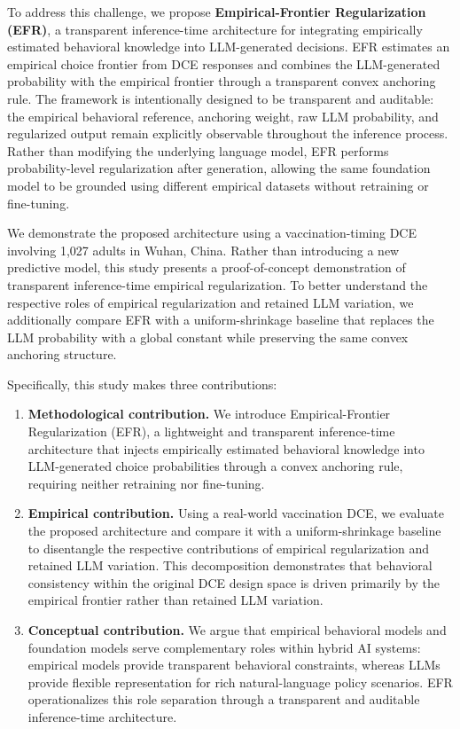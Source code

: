 \documentclass[11pt]{article}
\begin{document}
To address this challenge, we propose \textbf{Empirical-Frontier Regularization (EFR)}, a transparent inference-time architecture for integrating empirically estimated behavioral knowledge into LLM-generated decisions. EFR estimates an empirical choice frontier from DCE responses and combines the LLM-generated probability with the empirical frontier through a transparent convex anchoring rule. The framework is intentionally designed to be transparent and auditable: the empirical behavioral reference, anchoring weight, raw LLM probability, and regularized output remain explicitly observable throughout the inference process. Rather than modifying the underlying language model, EFR performs probability-level regularization after generation, allowing the same foundation model to be grounded using different empirical datasets without retraining or fine-tuning.

We demonstrate the proposed architecture using a vaccination-timing DCE involving 1,027 adults in Wuhan, China. Rather than introducing a new predictive model, this study presents a proof-of-concept demonstration of transparent inference-time empirical regularization. To better understand the respective roles of empirical regularization and retained LLM variation, we additionally compare EFR with a uniform-shrinkage baseline that replaces the LLM probability with a global constant while preserving the same convex anchoring structure.

Specifically, this study makes three contributions:

\begin{enumerate}

\item \textbf{Methodological contribution.}
We introduce Empirical-Frontier Regularization (EFR), a lightweight and transparent inference-time architecture that injects empirically estimated behavioral knowledge into LLM-generated choice probabilities through a convex anchoring rule, requiring neither retraining nor fine-tuning.

\item \textbf{Empirical contribution.}
Using a real-world vaccination DCE, we evaluate the proposed architecture and compare it with a uniform-shrinkage baseline to disentangle the respective contributions of empirical regularization and retained LLM variation. This decomposition demonstrates that behavioral consistency within the original DCE design space is driven primarily by the empirical frontier rather than retained LLM variation.

\item \textbf{Conceptual contribution.}
We argue that empirical behavioral models and foundation models serve complementary roles within hybrid AI systems: empirical models provide transparent behavioral constraints, whereas LLMs provide flexible representation for rich natural-language policy scenarios. EFR operationalizes this role separation through a transparent and auditable inference-time architecture.

\end{enumerate}
\end{document}
